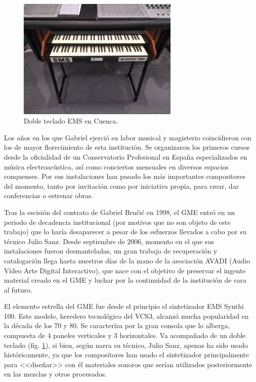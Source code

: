 \begin{figure}
	\centering
	\includegraphics[width=0.7\textwidth]{teclado_EMS}
	\caption[Doble teclado EMS en Cuenca.]{Doble teclado EMS en Cuenca.}
	\label{fig:teclado_EMS}
\end{figure}

Los años en los que Gabriel ejerció su labor musical y magisterio coincidieron con los de mayor florecimiento de esta institución. Se organizaron los primeros cursos desde la oficialidad de un Conservatorio Profesional en España especializados en música electroacústica, así como conciertos mensuales en diversos espacios conquenses. Por sus instalaciones han pasado los más importantes compositores del momento, tanto por invitación como por iniciativa propia, para crear, dar conferencias o estrenar obras.

Tras la escisión del contrato de Gabriel Brnčić en 1998, el GME entró en un periodo de decadencia institucional (por motivos que no son objeto de este trabajo) que lo haría desaparecer a pesar de los esfuerzos llevados a cabo por su técnico Julio Sanz. Desde septiembre de 2006, momento en el que sus instalaciones fueron desmanteladas, un gran trabajo de recuperación y catalogación llega hasta nuestros días de la mano de la asociación AVADI (Audio Vídeo Arte Digital Interactivo), que nace con el objetivo de preservar el ingente material creado en el GME y luchar por la continuidad de la institución de cara al futuro. 

El elemento estrella del GME fue desde el principio el sintetizador EMS Synthi 100. Este modelo, heredero tecnológico del VCS3, alcanzó mucha popularidad en la década de los 70 y 80. Se caracteríza por la gran consola que lo alberga, compuesta de 4 paneles verticales y 3 horizontales. Va acompañado de un doble teclado (fig. \ref{fig:teclado_EMS}), si bien, según narra su técnico, Julio Sanz, apenas ha sido usado históricamente, ya que los compositores han usado el sintetizador principalmente para <<diseñar>> con él materiales sonoros que serían utilizados posteriormente en las mezclas y otros procesados.

